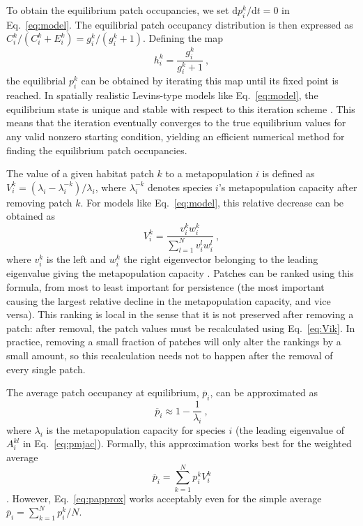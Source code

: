 \documentclass[11pt]{article}
\newcommand{\ud}{\text{d}}
\newcommand{\ol}[1]{\overline{#1}}
\begin{document}
To obtain the equilibrium patch occupancies, we set $\ud p_i^k / \ud t = 0$ in Eq.~\ref{eq:model}. The equilibrial patch occupancy distribution is then expressed as $C_i^k/(C_i^k + E_i^k) = g_i^k / (g_i^k + 1)$. Defining the map
\begin{equation}
  \label{eq:itermap}
  h_i^k = \frac{g_i^k}{g_i^k + 1} \ ,
\end{equation}
the equilibrial $p_i^k$ can be obtained by iterating this map until its fixed point is reached. In spatially realistic Levins-type models like Eq.~\ref{eq:model}, the equilibrium state is unique and stable with respect to this iteration scheme \citep{OvaskainenHanski2001}. This means that the iteration eventually converges to the true equilibrium values for any valid nonzero starting condition, yielding an efficient numerical method for finding the equilibrium patch occupancies.

The value of a given habitat patch $k$ to a metapopulation $i$ is defined as $V_i^k = (\lambda_i - \lambda_i^{-k}) / \lambda_i$, where $\lambda_i^{-k}$ denotes species $i$'s  metapopulation capacity after removing patch $k$. For models like Eq.~\ref{eq:model}, this relative decrease can be obtained as
\begin{equation}
  \label{eq:Vik}
  V_i^k = \frac{v_i^k w_i^k}{\sum_{l=1}^N v_i^l w_i^l} \ ,
\end{equation}
where $v_i^k$ is the left and $w_i^k$ the right eigenvector belonging to the leading eigenvalue giving the metapopulation capacity \citep{OvaskainenHanski2001}. Patches can be ranked using this formula, from most to least important for persistence (the most important causing the largest relative decline in the metapopulation capacity, and vice versa). This ranking is local in the sense that it is not preserved after removing a patch: after removal, the patch values must be recalculated using Eq.~\ref{eq:Vik}. In practice, removing a small fraction of patches will only alter the rankings by a small amount, so this recalculation needs not to happen after the removal of every single patch.

The average patch occupancy at equilibrium, $\ol{p}_i$, can be approximated as
\begin{equation}
  \label{eq:papprox}
  \ol{p}_i \approx 1 - \frac{1}{\lambda_i} \ ,
\end{equation}
where $\lambda_i$ is the metapopulation capacity for species $i$ (the leading eigenvalue of $A_i^{kl}$ in Eq.~\ref{eq:pmjac}). Formally, this approximation works best for the weighted average
\begin{equation}
  \label{eq:weighted}
  \ol{p}_i = \sum_{k=1}^N p_i^k V_i^k
\end{equation}
\citep{OvaskainenHanski2001}. However, Eq.~\ref{eq:papprox} works acceptably even for the simple average $\ol{p}_i = \sum_{k=1}^N p_i^k / N$.
\end{document}
